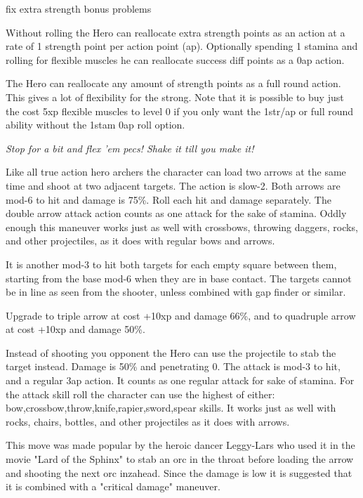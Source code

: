 \todo fix extra strength bonus problems


Without rolling the Hero can reallocate extra strength points as an action at a rate of 1 strength point per action point (ap). Optionally spending 1 stamina and rolling for flexible muscles he can reallocate success diff points as a 0ap action.

The Hero can reallocate any amount of strength points as a full round action.
This gives a lot of flexibility for the strong. Note that it is possible to buy just the cost 5xp flexible muscles to level 0 if you only want the 1str/ap or full round ability without the 1stam 0ap roll option.

\noindent \emph{Stop for a bit and flex 'em pecs! Shake it till you make it!}


 Like all true action hero archers the character can load two arrows at the same time and shoot at two adjacent targets. The action is slow-2. Both arrows are mod-6 to hit and damage is 75\%. Roll each hit and damage separately. The double arrow attack action counts as one attack for the sake of stamina. 
Oddly enough this maneuver works just as well with crossbows, throwing daggers, rocks, and other projectiles, as it does with regular bows and arrows.

It is another mod-3 to hit both targets for each empty square between them, starting from the base mod-6 when they are in base contact. The targets cannot be in line as seen from the shooter, unless combined with gap finder or similar.

Upgrade to triple arrow at cost +10xp and damage 66\%, and to quadruple arrow at cost +10xp and damage 50\%.


 Instead of shooting you opponent the Hero can use the projectile to stab the target instead. Damage is 50\% and penetrating 0. The attack is mod-3 to hit, and a regular 3ap action. It counts as one regular attack for sake of stamina. For the attack skill roll the character can use the highest of either: bow,crossbow,throw,knife,rapier,sword,spear skills.
It works just as well with rocks, chairs, bottles, and other projectiles as it does with arrows.

This move was made popular by the heroic dancer Leggy-Lars who used it in the movie "Lard of the Sphinx" to stab an orc in the throat before loading the arrow and shooting the next orc inzahead. Since the damage is low it is suggested that it is combined with a "critical damage" maneuver.


